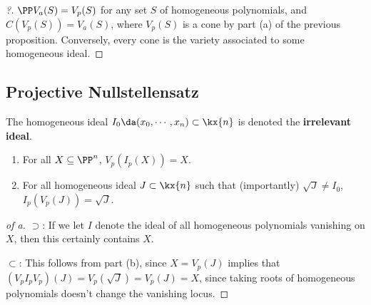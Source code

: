 \begin{proof}[?]

\(\PP V_a(S) = V_p(S)\) for any set \(S\) of homogeneous polynomials,
and \(C(V_p(S)) = V_a(S)\), where \(V_p(S)\) is a cone by part (a) of
the previous proposition. Conversely, every cone is the variety
associated to some homogeneous ideal.

\end{proof}

\hypertarget{projective-nullstellensatz}{%
\subsection{Projective
Nullstellensatz}\label{projective-nullstellensatz}}

\begin{definition}

The homogeneous ideal \(I_0 \da (x_0, \cdots, x_n) \subset \kx{n}\) is
denoted the \textbf{irrelevant ideal}.

\end{definition}

\begin{proposition}

\envlist

\begin{enumerate}
\def\labelenumi{\alph{enumi}.}
\item
  For all \(X\subseteq \PP^n\), \(V_p(I_p(X)) = X\).
\item
  For all homogeneous ideal \(J\subset \kx{n}\) such that (importantly)
  \(\sqrt{J} \neq I_0\), \(I_p(V_p(J)) = \sqrt J\).
\end{enumerate}

\end{proposition}

\begin{proof}[of a]

\(\supset\): If we let \(I\) denote the ideal of all homogeneous
polynomials vanishing on \(X\), then this certainly contains \(X\).

\(\subset\): This follows from part (b), since \(X = V_p(J)\) implies
that \((V_p I_p V_p)(J) = V_p(\sqrt J) = V_p(J) = X\), since taking
roots of homogeneous polynomials doesn't change the vanishing locus.

\end{proof}

